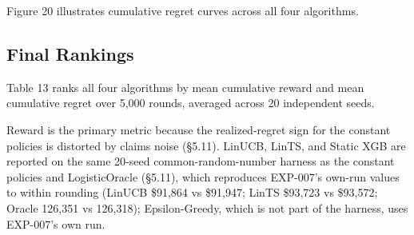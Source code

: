 Figure 20 illustrates cumulative regret curves across all four algorithms.


\subsection{Final Rankings}\label{final-rankings}

Table 13 ranks all four algorithms by mean cumulative reward and mean cumulative regret over 5,000 rounds, averaged across 20 independent seeds.

\label{tab:5.3.1}

Reward is the primary metric because the realized-regret sign for the constant policies is distorted by claims noise (§5.11). LinUCB, LinTS, and Static XGB are reported on the same 20-seed common-random-number harness as the constant policies and LogisticOracle (§5.11), which reproduces EXP-007's own-run values to within rounding (LinUCB \$91,864 vs \$91,947; LinTS \$93,723 vs \$93,572; Oracle 126,351 vs 126,318); Epsilon-Greedy, which is not part of the harness, uses EXP-007's own run.


